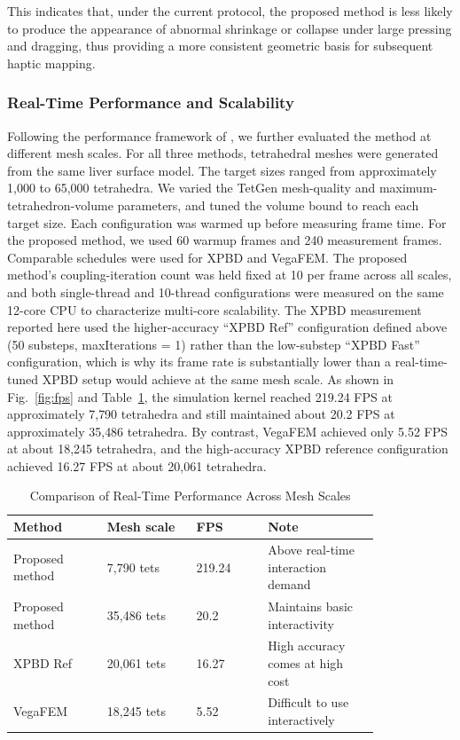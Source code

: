 \documentclass{ieeeaccess}
\begin{document}
This indicates that, under the current protocol, the proposed method is less likely to produce the appearance of abnormal shrinkage or collapse under large pressing and dragging, thus providing a more consistent geometric basis for subsequent haptic mapping.

\subsubsection{Real-Time Performance and Scalability}
Following the performance framework of \cite{wang2025group}, we further evaluated the method at different mesh scales. For all three methods, tetrahedral meshes were generated from the same liver surface model. The target sizes ranged from approximately 1,000 to 65,000 tetrahedra. We varied the TetGen mesh-quality and maximum-tetrahedron-volume parameters, and tuned the volume bound to reach each target size. Each configuration was warmed up before measuring frame time. For the proposed method, we used 60 warmup frames and 240 measurement frames. Comparable schedules were used for XPBD and VegaFEM. The proposed method's coupling-iteration count was held fixed at 10 per frame across all scales, and both single-thread and 10-thread configurations were measured on the same 12-core CPU to characterize multi-core scalability. The XPBD measurement reported here used the higher-accuracy ``XPBD Ref'' configuration defined above (50 substeps, maxIterations = 1) rather than the low-substep ``XPBD Fast'' configuration, which is why its frame rate is substantially lower than a real-time-tuned XPBD setup would achieve at the same mesh scale. As shown in Fig.~\ref{fig:fps} and Table~\ref{tab:fps}, the simulation kernel reached 219.24 FPS at approximately 7{,}790 tetrahedra and still maintained about 20.2 FPS at approximately 35{,}486 tetrahedra. By contrast, VegaFEM achieved only 5.52 FPS at about 18{,}245 tetrahedra, and the high-accuracy XPBD reference configuration achieved 16.27 FPS at about 20{,}061 tetrahedra.

\begin{table}[htbp]
\caption{Comparison of Real-Time Performance Across Mesh Scales}
\label{tab:fps}
\centering
\footnotesize
\renewcommand{\arraystretch}{1.15}
\begin{tabular}{|p{0.21\linewidth}|p{0.20\linewidth}|p{0.16\linewidth}|p{0.25\linewidth}|}
\hline
Method & Mesh scale & FPS & Note \\
\hline
Proposed method & 7,790 tets & 219.24 & Above real-time interaction demand \\
\hline
Proposed method & 35,486 tets & 20.2 & Maintains basic interactivity \\
\hline
XPBD Ref & 20,061 tets & 16.27 & High accuracy comes at high cost \\
\hline
VegaFEM & 18,245 tets & 5.52 & Difficult to use interactively \\
\hline
\end{tabular}
\end{table}
\end{document}
